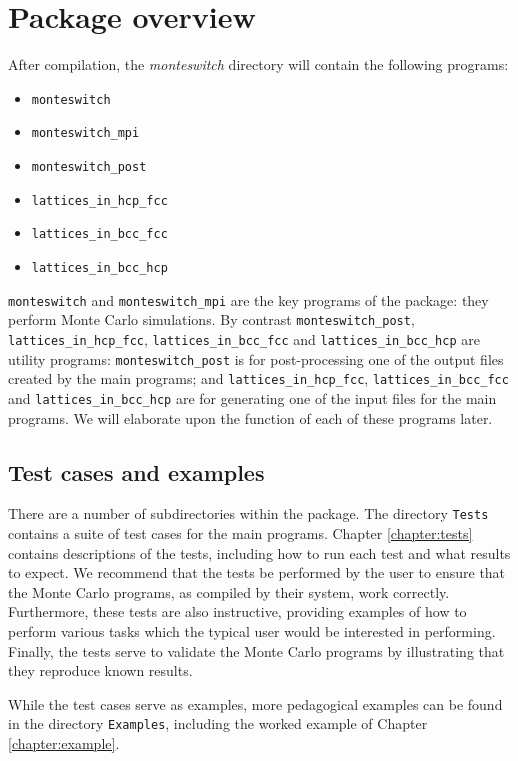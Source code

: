 \documentclass{report}
\begin{document}
\section{Package overview}
After compilation, the \emph{monteswitch} directory will contain the following programs:
\begin{itemize}
\item\texttt{monteswitch}
\item\texttt{monteswitch\_mpi}
\item\texttt{monteswitch\_post}
\item\texttt{lattices\_in\_hcp\_fcc}
\item\texttt{lattices\_in\_bcc\_fcc}
\item\texttt{lattices\_in\_bcc\_hcp}
\end{itemize}
\texttt{monteswitch} and \texttt{monteswitch\_mpi} are the key programs of the package: they perform Monte Carlo simulations. 
By contrast \texttt{monteswitch\_post}, \texttt{lattices\_in\_hcp\_fcc}, \texttt{lattices\_in\_bcc\_fcc} and 
\texttt{lattices\_in\_bcc\_hcp} are utility programs: \texttt{monteswitch\_post} is for post-processing one of the output files created 
by the main programs; and \texttt{lattices\_in\_hcp\_fcc}, \texttt{lattices\_in\_bcc\_fcc} and \texttt{lattices\_in\_bcc\_hcp} are for generating 
one of the input files for the main programs. We will elaborate upon the function of each of these programs later.

\subsection{Test cases and examples}
There are a number of subdirectories within the package. The directory \texttt{Tests} contains a suite of test cases for the main programs. 
Chapter \ref{chapter:tests} contains descriptions of the tests, including how to run each test and what results 
to expect. We recommend that the tests be performed by the user to ensure that the Monte Carlo programs, as compiled by their system, work
correctly. Furthermore, these tests are also instructive, providing examples of how to perform various tasks which the typical user would be 
interested in performing. Finally, the tests serve to validate the Monte Carlo programs by illustrating that they reproduce known results.

While the test cases serve as examples, more pedagogical examples can be found in the directory \texttt{Examples}, including the worked example
of Chapter \ref{chapter:example}.
\end{document}
